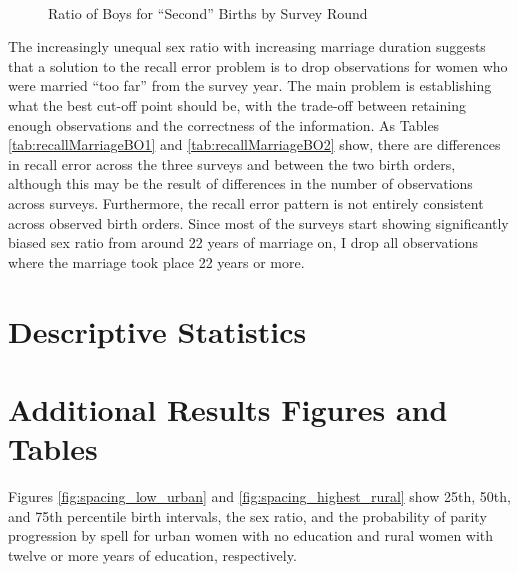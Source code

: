 \documentclass[12pt,letterpaper]{article}
\begin{document}
\begin{figure}
\centering
{}
 \\
\caption{Ratio of Boys for ``Second'' Births by Survey Round}
\label{fig:sex_ratio_recall_rounds_bo2}
\end{figure}


The increasingly unequal sex ratio with increasing marriage duration suggests that
a solution to the recall error problem is to drop observations for 
women who were married ``too far'' from the survey year.
The main problem is establishing what the best cut-off point should be, with the
trade-off between retaining enough observations and the correctness of the information.
As Tables \ref{tab:recallMarriageBO1} and \ref{tab:recallMarriageBO2} show, there are 
differences in recall error across the three surveys and between the two birth
orders, although this may be the result of differences in the number of observations 
across surveys.
Furthermore, the recall error pattern is not entirely consistent across observed birth 
orders.
Since most of the surveys start showing significantly biased sex ratio from around 22
years of marriage on, I drop all observations where the marriage took place 22 years
or more.


\clearpage
\newpage

\section{Descriptive Statistics}
\setcounter{figure}{0}
\setcounter{table}{0}




\clearpage
\newpage



\section{Additional Results Figures and  Tables}

\setcounter{figure}{0}
\setcounter{table}{0}


Figures \ref{fig:spacing_low_urban} and \ref{fig:spacing_highest_rural} show 25th, 50th,
and 75th percentile birth intervals, the sex ratio, and the probability of parity
progression by spell for urban women with no education and rural women with twelve or
more years of education, respectively.
\end{document}
